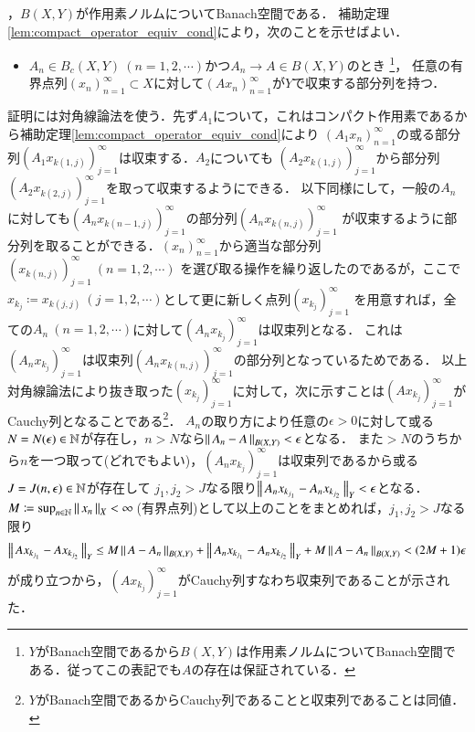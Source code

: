 	\begin{prf}
		，$B(X,Y)$が作用素ノルムについてBanach空間である．
		補助定理\ref{lem:compact_operator_equiv_cond}により，次のことを示せばよい．
		\begin{itemize}
			\item $A_n \in B_c(X,Y)\ (n=1,2,\cdots)$かつ$A_n \rightarrow A \in B(X,Y)$のとき
			\footnote{$Y$がBanach空間であるから$B(X,Y)$は作用素ノルムについてBanach空間である．従ってこの表記でも$A$の存在は保証されている．}，
			任意の有界点列$(x_n)_{n=1}^{\infty} \subset X$に対して$(Ax_n)_{n=1}^{\infty}$が$Y$で収束する部分列を持つ．
		\end{itemize}
		証明には対角線論法を使う．先ず$A_1$について，これはコンパクト作用素であるから補助定理\ref{lem:compact_operator_equiv_cond}により
		$\left(A_1x_n\right)_{n=1}^{\infty}$の或る部分列$\left(A_1x_{k(1,j)}\right)_{j=1}^{\infty}$は収束する．$A_2$についても
		$\left(A_2x_{k(1,j)}\right)_{j=1}^{\infty}$から部分列$\left(A_2x_{k(2,j)}\right)_{j=1}^{\infty}$を取って収束するようにできる．
		以下同様にして，一般の$A_n$に対しても$\left(A_nx_{k(n-1,j)}\right)_{j=1}^{\infty}$の部分列$\left(A_nx_{k(n,j)}\right)_{j=1}^{\infty}$
		が収束するように部分列を取ることができる．$(x_n)_{n=1}^{\infty}$から適当な部分列$\left(x_{k(n,j)}\right)_{j=1}^{\infty}\ (n=1,2,\cdots)$
		を選び取る操作を繰り返したのであるが，ここで$x_{k_j} \coloneqq x_{k(j,j)}\ (j=1,2,\cdots)$として更に新しく点列$(x_{k_j})_{j=1}^{\infty}$
		を用意すれば，全ての$A_n\ (n=1,2,\cdots)$に対して$\left(A_nx_{k_j}\right)_{j=1}^{\infty}$は収束列となる．
		これは$\left(A_nx_{k_j}\right)_{j=1}^{\infty}$は収束列$\left(A_nx_{k(n,j)}\right)_{j=1}^{\infty}$の部分列となっているためである．
		以上対角線論法により抜き取った$(x_{k_j})_{j=1}^{\infty}$に対して，次に示すことは$\left(Ax_{k_j}\right)_{j=1}^{\infty}$が
		Cauchy列となることである\footnote{$Y$がBanach空間であるからCauchy列であることと収束列であることは同値．}．
		$A_n$の取り方により任意の$\epsilon > 0$に対して或る$N = N(\epsilon) \in \mathbb{N}$が存在し，$n > N$なら$\left\|\, A_n - A\, \right\|_{B(X,Y)} < \epsilon$となる．
		また$> N$のうちから$n$を一つ取って(どれでもよい)，$\left(A_nx_{k_j}\right)_{j=1}^{\infty}$は収束列であるから或る$J=J(n,\epsilon) \in \mathbb{N}$が存在して
		$j_1,j_2 > J$なる限り$\left\|\, A_nx_{k_{j_1}} - A_nx_{k_{j_2}}\, \right\|_{Y} < \epsilon$となる．
		$M \coloneqq \sup{n\in\N}{\Norm{x_n}{X}} < \infty\ $(有界点列)として以上のことをまとめれば，$j_1,j_2 > J$なる限り
		\begin{align}
			\left\|\, Ax_{k_{j_1}} - Ax_{k_{j_2}}\, \right\|_{Y} \leq M\left\|\, A- A_n\, \right\|_{B(X,Y)} + \left\|\, A_nx_{k_{j_1}} - A_nx_{k_{j_2}}\, \right\|_{Y} + M\left\|\, A- A_n\, \right\|_{B(X,Y)} < (2M+1)\epsilon
		\end{align}
		が成り立つから，$\left(Ax_{k_j}\right)_{j=1}^{\infty}$がCauchy列すなわち収束列であることが示された．
		\QED
	\end{prf}
	
